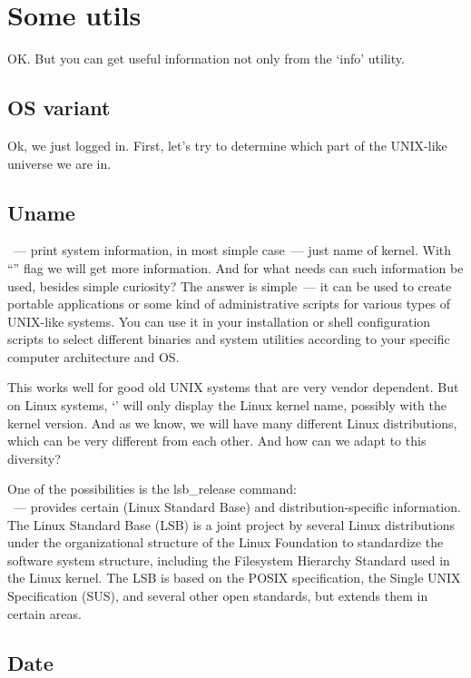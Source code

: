 \section*{Some utils}

OK. But you can get useful information not only from the `info' utility.

\subsection*{OS variant}

Ok, we just logged in. First, let's try to determine which part of
the UNIX-like universe we are in.

\subsection*{Uname}

~--- print system information, in most simple case~---
just name of kernel. With ``'' flag we will get more information.
And for what needs can such information be used, besides simple curiosity?
The answer is simple~--- it can be used to create portable applications or
some kind of administrative scripts for various types of UNIX-like systems.
You can use it in your installation or shell configuration scripts to select
different binaries and system utilities according to your specific computer
architecture and OS.

This works well for good old UNIX systems that are very vendor dependent.
But on Linux systems, `' will only display the Linux kernel name,
possibly with the kernel version. And as we know, we will have many
different Linux distributions, which can be very different from each other.
And how can we adapt to this diversity?

One of the possibilities is the lsb\_release command:\\
~--- provides certain  (Linux Standard Base)
and distribution-specific information. The Linux Standard Base (LSB) is a joint
project by several Linux distributions under the organizational structure of
the Linux Foundation to standardize the software system structure, including
the Filesystem Hierarchy Standard used in the Linux kernel. The LSB is based on
the POSIX specification, the Single UNIX Specification (SUS),
and several other open standards, but extends them in certain areas.

\subsection*{Date}

